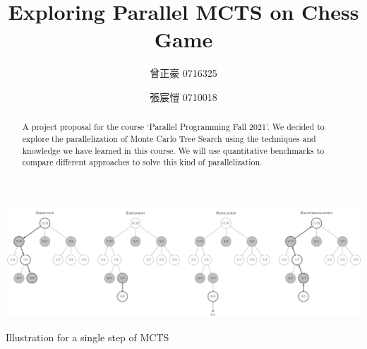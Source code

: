 \documentclass[sigconf]{acmart}
\begin{document}
\title{Exploring Parallel MCTS on Chess Game}


\author{曾正豪 0716325}

\author{張宸愷 0710018}





\begin{abstract}
  A project proposal for the course `Parallel Programming Fall 2021'.
  We decided to explore the parallelization of Monte Carlo Tree Search using the techniques and knowledge we have learned in this course. We will use quantitative benchmarks to compare different approaches to solve this kind of parallelization. 
\end{abstract}





\begin{teaserfigure}
  \includegraphics[width=\textwidth]{MCTS-steps.png}
  \caption{Illustration for a single step of MCTS}
\label{fig:teaser}
\end{teaserfigure}
\end{document}
